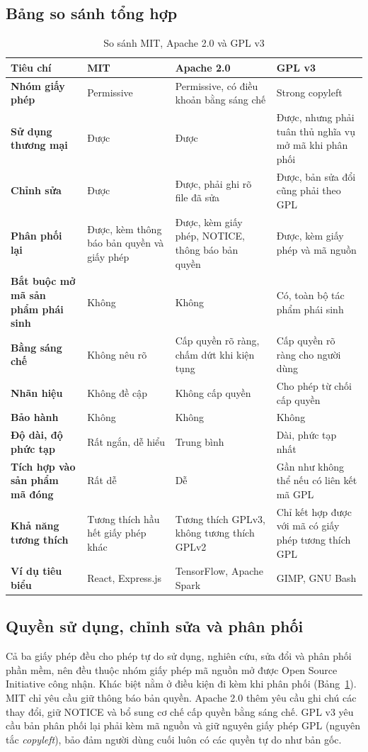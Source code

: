 \documentclass[12pt,a4paper]{article}
\begin{document}
\subsection{Bảng so sánh tổng hợp}
\begin{table}[htbp]
\centering
\caption{So sánh MIT, Apache 2.0 và GPL v3}\label{tab:compare}
\small
\renewcommand{\arraystretch}{1.2}
\begin{tabularx}{\textwidth}{@{}>{\raggedright\bfseries}p{2.6cm} >{\raggedright\arraybackslash}X >{\raggedright\arraybackslash}X >{\raggedright\arraybackslash}X@{}}
\toprule
Tiêu chí & \textbf{MIT} & \textbf{Apache 2.0} & \textbf{GPL v3}\\\midrule
Nhóm giấy phép & Permissive & Permissive, có điều khoản bằng sáng chế & Strong copyleft\\
Sử dụng thương mại & Được & Được & Được, nhưng phải tuân thủ nghĩa vụ mở mã khi phân phối\\
Chỉnh sửa & Được & Được, phải ghi rõ file đã sửa & Được, bản sửa đổi cũng phải theo GPL\\
Phân phối lại & Được, kèm thông báo bản quyền và giấy phép & Được, kèm giấy phép, NOTICE, thông báo bản quyền & Được, kèm giấy phép và mã nguồn\\
Bắt buộc mở mã sản phẩm phái sinh & Không & Không & Có, toàn bộ tác phẩm phái sinh\\
Bằng sáng chế & Không nêu rõ & Cấp quyền rõ ràng, chấm dứt khi kiện tụng & Cấp quyền rõ ràng cho người dùng\\
Nhãn hiệu & Không đề cập & Không cấp quyền & Cho phép từ chối cấp quyền\\
Bảo hành & Không & Không & Không\\
Độ dài, độ phức tạp & Rất ngắn, dễ hiểu & Trung bình & Dài, phức tạp nhất\\
Tích hợp vào sản phẩm mã đóng & Rất dễ & Dễ & Gần như không thể nếu có liên kết mã GPL\\
Khả năng tương thích & Tương thích hầu hết giấy phép khác & Tương thích GPLv3, không tương thích GPLv2 & Chỉ kết hợp được với mã có giấy phép tương thích GPL\\
Ví dụ tiêu biểu & React, Express.js & TensorFlow, Apache Spark & GIMP, GNU Bash\\\bottomrule
\end{tabularx}
\end{table}

\subsection{Quyền sử dụng, chỉnh sửa và phân phối}
Cả ba giấy phép đều cho phép tự do sử dụng, nghiên cứu, sửa đổi và phân phối phần mềm, nên đều thuộc nhóm giấy phép mã nguồn mở được Open Source Initiative công nhận. Khác biệt nằm ở điều kiện đi kèm khi phân phối (Bảng~\ref{tab:compare}). MIT chỉ yêu cầu giữ thông báo bản quyền. Apache 2.0 thêm yêu cầu ghi chú các thay đổi, giữ NOTICE và bổ sung cơ chế cấp quyền bằng sáng chế. GPL v3 yêu cầu bản phân phối lại phải kèm mã nguồn và giữ nguyên giấy phép GPL (nguyên tắc \emph{copyleft}), bảo đảm người dùng cuối luôn có các quyền tự do như bản gốc.
\end{document}
